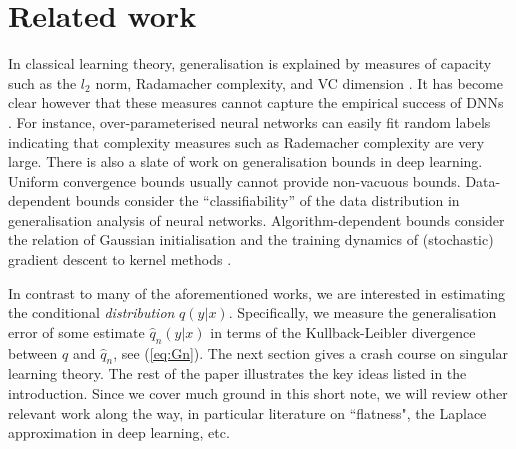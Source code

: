 \documentclass[11pt]{article}
\numberwithin{equation}{section}
\theoremstyle{plain}
\theoremstyle{definition}
\begin{document}
\section{Related work}
In classical learning theory, generalisation is explained by measures of capacity such as the $l_2$ norm, Radamacher complexity, and VC dimension \citep{bousquet2003introduction}. It has become clear however that these measures cannot capture the empirical success of DNNs \citep{zhang_understanding_2017}. 
For instance, over-parameterised neural networks can easily fit random labels \citep{zhang_understanding_2017,du2018gradient,allen2019convergence} indicating that complexity measures such as Rademacher complexity are very large.
There is also a slate of work on generalisation bounds in deep learning. Uniform convergence bounds \citep{neyshabur2015norm,bartlett2017spectrally,neyshabur2019towards,arora2018stronger} usually cannot provide non-vacuous bounds.
Data-dependent bounds \citep{brutzkus2018sgd,li2018learning,allen2019learning} consider the ``classifiability'' of the data distribution in generalisation analysis of neural networks.
Algorithm-dependent bounds \citep{daniely2017sgd,arora2019fine,yehudai2019power,cao2019generalization} consider the relation of Gaussian initialisation and the training dynamics of (stochastic) gradient descent to kernel methods \citep{jacot2018neural}.

In contrast to many of the aforementioned works, we are interested in estimating the conditional \textit{distribution} $q(y|x)$. Specifically, we measure the generalisation error of some estimate $\hat q_n(y|x)$ in terms of the Kullback-Leibler divergence between $q$ and $\hat q_n$, see (\ref{eq:Gn}). The next section gives a crash course on singular learning theory. The rest of the paper illustrates the key ideas listed in the introduction. Since we cover much ground in this short note, we will review other relevant work along the way, in particular literature on ``flatness", the Laplace approximation in deep learning, etc. 
\end{document}
